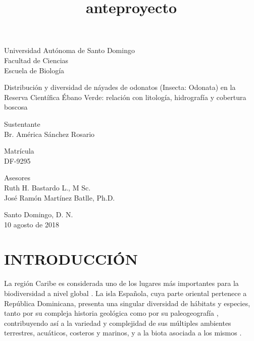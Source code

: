 \documentclass[12pt,letterpaper,spanish]{article}
\title{anteproyecto}
\date{}
\begin{document}
\thispagestyle{empty}
\begin{center}

\vspace*{0.5cm}

Universidad Autónoma de Santo Domingo\\
Facultad de Ciencias\\
Escuela de Biología

\vspace{1.0cm}
Distribución y diversidad de náyades de odonatos (Insecta: Odonata) en la Reserva Científica Ébano Verde: relación con litología, hidrografía y cobertura boscosa

\vspace{0.5cm}

\vspace{0.5cm}
Sustentante\\
Br. América Sánchez Rosario

\vspace{0.5cm}
Matrícula\\
DF-9295

\vspace{0.5cm}
Asesores\\
Ruth H. Bastardo L., M Sc.\\
José Ramón Martínez Batlle, Ph.D.

\vspace{0.5cm}
Santo Domingo, D. N.\\
10 agosto de 2018

\end{center}





\newpage
\section*{INTRODUCCIÓN}

La región Caribe es considerada uno de los lugares más importantes para la biodiversidad a nivel global \citep{myers2000biodiversity}. La isla Española, cuya parte oriental pertenece a República Dominicana, presenta una singular diversidad de hábitats y especies, tanto por su compleja historia geológica \citep{perez2010geologia} como por su paleogeografía \citep{graham2003geohistory, pindell2009tectonic}, contribuyendo así a la variedad y complejidad de sus múltiples ambientes terrestres, acuáticos, costeros y marinos, y a la  biota asociada a los mismos \citep{fern2015reservas}.
\end{document}
